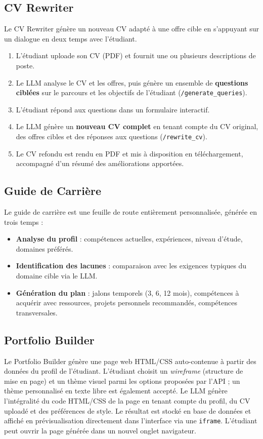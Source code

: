 ﻿\documentclass[12pt,a4paper]{report}
\begin{document}
\subsection{CV Rewriter}

Le CV Rewriter génère un nouveau CV adapté à une offre cible en s'appuyant sur un dialogue en deux temps avec l'étudiant.

\begin{enumerate}
  \item L'étudiant uploade son CV (PDF) et fournit une ou plusieurs descriptions de poste.
  \item Le LLM analyse le CV et les offres, puis génère un ensemble de \textbf{questions ciblées} sur le parcours et les objectifs de l'étudiant (\texttt{/generate\_queries}).
  \item L'étudiant répond aux questions dans un formulaire interactif.
  \item Le LLM génère un \textbf{nouveau CV complet} en tenant compte du CV original, des offres cibles et des réponses aux questions (\texttt{/rewrite\_cv}).
  \item Le CV refondu est rendu en PDF et mis à disposition en téléchargement, accompagné d'un résumé des améliorations apportées.
\end{enumerate}

\subsection{Guide de Carrière}

Le guide de carrière est une feuille de route entièrement personnalisée, générée en trois temps :
\begin{itemize}
  \item \textbf{Analyse du profil} : compétences actuelles, expériences, niveau d'étude, domaines préférés.
  \item \textbf{Identification des lacunes} : comparaison avec les exigences typiques du domaine cible via le LLM.
  \item \textbf{Génération du plan} : jalons temporels (3, 6, 12 mois), compétences à acquérir avec ressources, projets personnels recommandés, compétences transversales.
\end{itemize}

\subsection{Portfolio Builder}

Le Portfolio Builder génère une page web HTML/CSS auto-contenue à partir des données du profil de l'étudiant. L'étudiant choisit un \textit{wireframe} (structure de mise en page) et un thème visuel parmi les options proposées par l'API ; un thème personnalisé en texte libre est également accepté. Le LLM génère l'intégralité du code HTML/CSS de la page en tenant compte du profil, du CV uploadé et des préférences de style. Le résultat est stocké en base de données et affiché en prévisualisation directement dans l'interface via une \texttt{iframe}. L'étudiant peut ouvrir la page générée dans un nouvel onglet navigateur.
\end{document}
